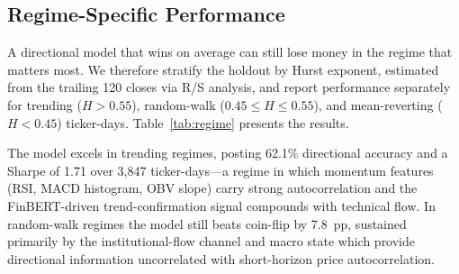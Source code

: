 \begin{table}[t]
\centering
\caption{Hyperparameter sensitivity for the two tree base learners (full
pipeline, 2024 holdout). All other components are fixed at chosen values.}
\label{tab:hyper}
\end{table}

\subsection{Regime-Specific Performance}
\label{subsec:regime}

A directional model that wins on average can still lose money in the regime
that matters most. We therefore stratify the holdout by Hurst exponent,
estimated from the trailing 120 closes via R/S analysis, and report
performance separately for trending ($H\!>\!0.55$), random-walk
($0.45\!\leq\!H\!\leq\!0.55$), and mean-reverting ($H\!<\!0.45$) ticker-days.
Table~\ref{tab:regime} presents the results.

The model excels in trending regimes, posting 62.1\% directional accuracy
and a Sharpe of 1.71 over 3{,}847 ticker-days---a regime in which momentum
features (RSI, MACD histogram, OBV slope) carry strong autocorrelation
and the FinBERT-driven trend-confirmation signal compounds with technical
flow. In random-walk regimes the model still beats coin-flip by 7.8~pp,
sustained primarily by the institutional-flow channel and macro state
which provide directional information uncorrelated with short-horizon price
autocorrelation.

